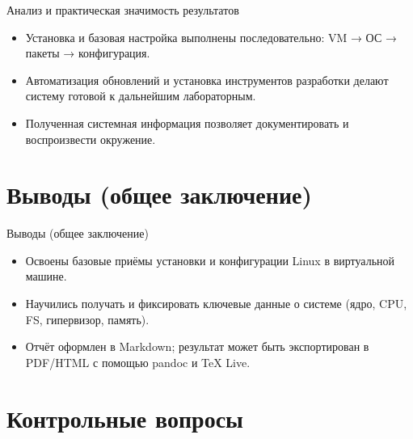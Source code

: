 \documentclass[
  ignorenonframetext,
  aspectratio=169,
  russian,
  aspectratio=169]{beamer}
\providecommand{\tightlist}{%
  \setlength{\itemsep}{0pt}\setlength{\parskip}{0pt}}
\begin{document}
\begin{frame}{Анализ и практическая значимость результатов}
\begin{itemize}[<+->]
\tightlist
\item
  Установка и базовая настройка выполнены последовательно: VM → ОС →
  пакеты → конфигурация.
\item
  Автоматизация обновлений и установка инструментов разработки делают
  систему готовой к дальнейшим лабораторным.
\item
  Полученная системная информация позволяет документировать и
  воспроизвести окружение.
\end{itemize}
\end{frame}

\section{Выводы (общее
заключение)}\label{ux432ux44bux432ux43eux434ux44b-ux43eux431ux449ux435ux435-ux437ux430ux43aux43bux44eux447ux435ux43dux438ux435}

\begin{frame}{Выводы (общее заключение)}
\begin{itemize}[<+->]
\tightlist
\item
  Освоены базовые приёмы установки и конфигурации Linux в виртуальной
  машине.
\item
  Научились получать и фиксировать ключевые данные о системе (ядро, CPU,
  FS, гипервизор, память).
\item
  Отчёт оформлен в Markdown; результат может быть экспортирован в
  PDF/HTML с помощью pandoc и TeX Live.
\end{itemize}
\end{frame}

\section{Контрольные
вопросы}\label{ux43aux43eux43dux442ux440ux43eux43bux44cux43dux44bux435-ux432ux43eux43fux440ux43eux441ux44b}
\end{document}
